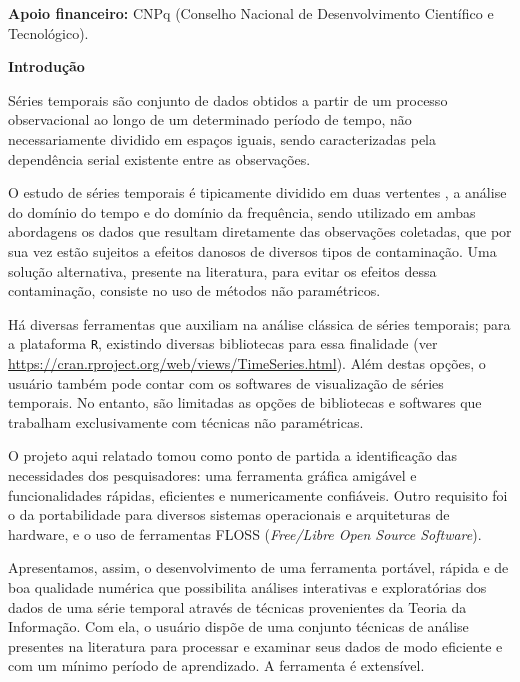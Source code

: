 \documentclass[12pt]{article}
\begin{document}

\textbf{Apoio financeiro:} CNPq (Conselho Nacional de Desenvolvimento Científico e Tecnológico).


\textbf{Introdução}

Séries temporais são conjunto de dados obtidos a partir de um processo observacional ao longo de um determinado período de tempo, não necessariamente dividido em espaços iguais, sendo caracterizadas pela dependência serial existente entre as observações.
 
 O estudo de séries temporais é tipicamente dividido em duas vertentes \cite{BrockwellDavis91}, a análise do domínio do tempo e do domínio da frequência, sendo utilizado em ambas abordagens os dados que resultam diretamente das observações coletadas, que por sua vez estão sujeitos a efeitos danosos de diversos tipos de contaminação. 
Uma solução alternativa, presente na literatura, para evitar os efeitos dessa contaminação, consiste no uso de métodos não paramétricos.

Há diversas ferramentas que auxiliam na análise clássica de séries temporais; para a plataforma \texttt  R, existindo diversas bibliotecas para essa finalidade (ver \url{https://cran.rproject.org/web/views/TimeSeries.html}). Além destas opções, o usuário também pode contar com os softwares de visualização de séries temporais. No entanto, são limitadas as opções de bibliotecas e softwares que trabalham exclusivamente com técnicas não paramétricas. 
    
O projeto aqui relatado tomou como ponto de partida a identificação das necessidades dos pesquisadores: uma ferramenta gráfica amigável e funcionalidades rápidas, eficientes e numericamente confiáveis.
Outro requisito foi o da portabilidade para diversos sistemas operacionais e arquiteturas de hardware, e o uso de ferramentas FLOSS (\textit{Free/Libre Open Source Software}).
 
Apresentamos, assim, o desenvolvimento de uma ferramenta portável, rápida e de boa qualidade numérica que possibilita análises interativas e exploratórias dos dados de uma série temporal através de técnicas provenientes da Teoria da Informação.
Com ela, o usuário dispõe de uma conjunto técnicas de análise presentes na literatura para processar e examinar seus dados de modo eficiente e com um mínimo período de aprendizado.
A ferramenta é extensível.
\end{document}
